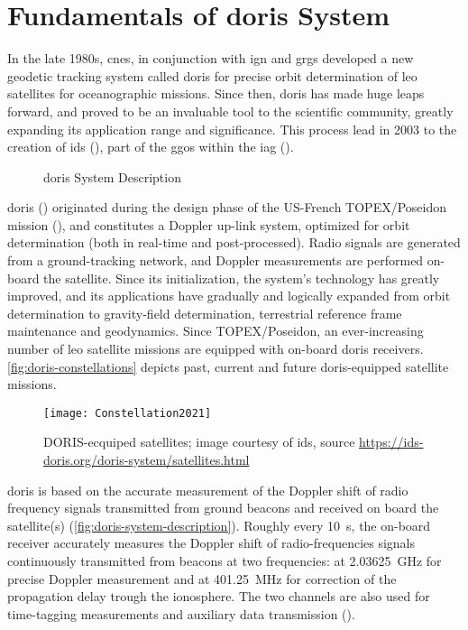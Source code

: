 \section{Fundamentals of \gls{doris} System}\label{sec:doris-system-fundamentals}
In the late 1980s, \gls{cnes}, in conjunction with \gls{ign} and \gls{grgs} developed 
a new geodetic tracking system called \gls{doris} for precise orbit determination 
of \gls{leo} satellites for oceanographic missions. Since then, \gls{doris} has 
made huge leaps forward, and proved to be an invaluable tool to the scientific community, 
greatly expanding its application range and significance. This process lead in 
2003 to the creation of \gls{ids} (\cite{Willis2016a}), part of the \gls{ggos} 
within the \gls{iag} (\cite{Willis2006}). 

\begin{figure}
  \centering
  
  \caption{\gls{doris} System Description}
  \label{fig:doris-system-description}
\end{figure}

\gls{doris} (\cite{Barlier2005}) originated during the design phase of the US-French 
TOPEX/Poseidon mission (\cite{Fu1994}), 
and constitutes a Doppler up-link system, optimized for orbit determination (both 
in real-time and post-processed). Radio signals are generated from a ground-tracking 
network, and Doppler measurements are performed on-board the satellite. Since its 
initialization, the system's technology has greatly improved, and its applications 
have gradually and logically expanded from orbit determination to gravity-field 
determination, terrestrial reference frame maintenance and geodynamics. Since TOPEX/Poseidon, an 
ever-increasing number of \gls{leo} satellite missions are equipped with on-board 
\gls{doris} receivers. \autoref{fig:doris-constellations} depicts past, current and 
future \gls{doris}-equipped satellite missions.

\begin{figure}[h!]
  \centering
  \texttt{[image: Constellation2021]}
  \caption{DORIS-ecquiped satellites; image courtesy of \gls{ids}, source \url{https://ids-doris.org/doris-system/satellites.html}}
  \label{fig:doris-constellations}
\end{figure}

\gls{doris} is based on the accurate measurement of the Doppler shift of radio 
frequency signals transmitted from ground beacons and received on board the 
satellite(s) (\autoref{fig:doris-system-description}). Roughly every \SI{10}{\second}, 
the on-board receiver accurately measures 
the Doppler shift of radio-frequencies signals continuously transmitted from 
beacons at two frequencies: at \SI{2.03625}{\GHz} for precise Doppler measurement 
and at \SI{401.25}{\MHz} for correction of the propagation delay trough the 
ionosphere. The two channels are also used for time-tagging measurements and 
auxiliary data transmission (\cite{Auriol2010}).


